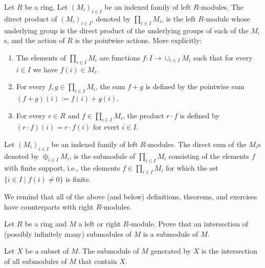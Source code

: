 \documentclass[11pt,a4paper]{article}
\begin{document}
\begin{definition}
  Let $R$ be a ring.
  Let $(M_i)_{i \in I}$ be an indexed family of left $R$-modules.
  The direct product of $(M_i)_{i \in I}$, denoted by $\prod_{i \in I} M_i$,
  is the left $R$-module whose underlying group is the direct product
  of the underlying groups of each of the $M_i$s,
  and the action of $R$ is the pointwise actions.
  More explicitly:
  \begin{enumerate}
    \item[(1)] The elements of $\prod_{i \in I} M_i$
      are functions $f \colon I \to \cup_{i \in I} M_i$ such that
      for every $i \in I$ we have $f(i) \in M_i$.
    \item[(2)] For every $f,g \in \prod_{i \in I} M_i$, the sum $f + g$
      is defined by the pointwise sum $(f + g)(i) := f(i) + g(i)$.
    \item[(3)] For every $r \in R$ and $f \in \prod_{i \in I} M_i$,
      the product $r \cdot f$ is defined by $(r \cdot f)(i) = r \cdot f(i)$
      for evert $i \in I$.
  \end{enumerate}
\end{definition}

\begin{definition}
  Let $(M_i)_{i \in I}$ be an indexed family of left $R$-modules.
  The direct sum of the $M_i$s denoted by $\oplus_{i \in I} M_i$,
  is the submodule of $\prod_{i \in I} M_i$ consisting of the elements
  $f$ with finite support, i.e., the elements $f \in \prod_{i \in I} M_i$
  for which the set $\{i \in I \mid f(i) \neq 0\}$ is finite.
\end{definition}

\begin{remark}
  We remind that all of the above (and below) 
  definitions, theorems, and exercises
  have counterparts with right $R$-modules.
\end{remark}

\begin{exercise}
  Let $R$ be a ring and $M$ a left or right $R$-module.
  Prove that an intersection of (possibly infinitely many) submodules of $M$
  is a submodule of $M$.
\end{exercise}

\begin{definition}
  Let $X$ be a subset of $M$.
  The submodule of $M$ generated by $X$ is the intersection of all submodules
  of $M$ that contain $X$.
\end{definition}
\end{document}
